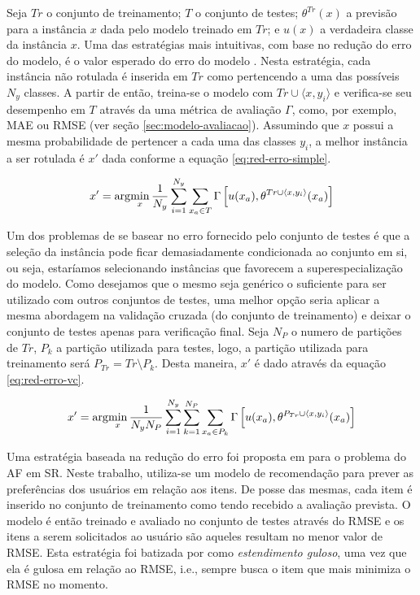 Seja $Tr$ o conjunto de treinamento; $T$ o conjunto de testes; $\theta^{Tr}(x)$ a previsão para a instância $x$ dada pelo modelo treinado em $Tr$; e $u(x)$ a verdadeira classe da instância $x$. Uma das estratégias mais intuitivas, com base no redução do erro do modelo, é o valor esperado do erro do modelo \citep{RubensRecSysHB2010}. Nesta estratégia, cada instância não rotulada é inserida em $Tr$ como pertencendo a uma das possíveis $N_y$ classes. A partir de então, treina-se o modelo com $Tr \cup \langle x, y_i \rangle$ e verifica-se seu desempenho em $T$ através da uma métrica de avaliação $\Gamma$, como, por exemplo, MAE ou RMSE (ver seção \ref{sec:modelo-avaliacao}). Assumindo que $x$ possui a mesma probabilidade de pertencer a cada uma das classes $y_i$, a melhor instância a ser rotulada é $x'$ dada conforme a equação \ref{eq:red-erro-simple}.

\begin{equation}
x' = \arg\!\min_x \frac{1}{N_y} \sum_{i=1}^{N_y} \sum_{x_a \in T} \Gamma \left[ u(x_a), \theta^{Tr \cup \langle x, y_i \rangle }(x_a) \right]
\label{eq:red-erro-simple}
\end{equation}

Um dos problemas de se basear no erro fornecido pelo conjunto de testes é que a seleção da instância pode ficar demasiadamente condicionada ao conjunto em si, ou seja, estaríamos selecionando instâncias que favorecem a superespecialização do modelo. Como desejamos que o mesmo seja genérico o suficiente para ser utilizado com outros conjuntos de testes, uma melhor opção seria aplicar a mesma abordagem na validação cruzada (do conjunto de treinamento) e deixar o conjunto de testes apenas para verificação final. Seja $N_P$ o numero de partições de $Tr$, $P_k$ a partição utilizada para testes, logo, a partição utilizada para treinamento será $P_{Tr} = Tr \setminus P_k$. Desta maneira, $x'$ é dado através da equação \ref{eq:red-erro-vc}.

\begin{equation}
x' = \arg\!\min_x \frac{1}{N_y N_P} \sum_{i=1}^{N_y} \sum_{k=1}^{N_P} \sum_{x_a \in P_k} \Gamma \left[ u(x_a), \theta^{P_{Tr} \cup \langle x, y_i \rangle }(x_a) \right]
\label{eq:red-erro-vc}
\end{equation}

Uma estratégia baseada na redução do erro foi proposta em \citep{Golbandi:2010:BRS:1871437.1871734} para o problema do AF em SR. Neste trabalho, utiliza-se um modelo de recomendação para prever as preferências dos usuários em relação aos itens. De posse das mesmas, cada item é inserido no conjunto de treinamento como tendo recebido a avaliação prevista. O modelo é então treinado e avaliado no conjunto de testes através do RMSE e os itens a serem solicitados ao usuário são aqueles resultam no menor valor de RMSE. Esta estratégia foi batizada por \citep{Golbandi:2010:BRS:1871437.1871734} como \textit{estendimento guloso}, uma vez que ela é gulosa em relação ao RMSE, i.e., sempre busca o item que mais minimiza o RMSE no momento.

